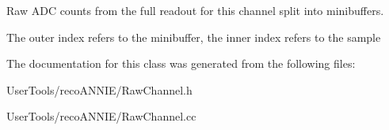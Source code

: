 Raw A\-D\-C counts from the full readout for this channel split into minibuffers. 

The outer index refers to the minibuffer, the inner index refers to the sample 

The documentation for this class was generated from the following files\-:\begin{DoxyCompactItemize}
\item 
User\-Tools/reco\-A\-N\-N\-I\-E/Raw\-Channel.\-h\item 
User\-Tools/reco\-A\-N\-N\-I\-E/Raw\-Channel.\-cc\end{DoxyCompactItemize}
